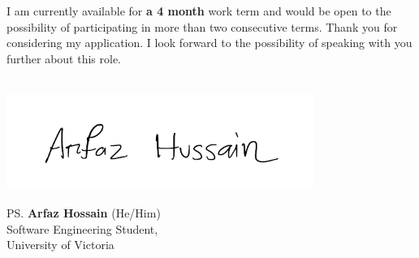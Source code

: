 \documentclass[a4paper, 12pt, oneside]{letter}
\newcommand{\Terms}{a 4 month}
\begin{document}
I am currently available for \textbf{\Terms} work term and would be open to the possibility of participating in more than two consecutive terms. Thank you for considering my application. I look forward to the possibility of speaking with you further about this role. \\\\
\vspace{10pt}
\vspace{-25pt}\begin{flushleft}
\hspace*{-1cm}\includegraphics[width=10cm]{../../9.2 PreProcessed/signature.png}\vspace{-1cm}
\end{flushleft}
\vspace{-10pt}\ps{\textbf{Arfaz Hossain} (He/Him)\\
Software Engineering Student,\\
University of Victoria} 
\end{document}
